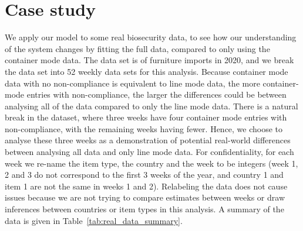 \documentclass[aoas]{imsart}
\begin{document}
%
%
%
%
%
%


\section{Case study}
We apply our model to some real biosecurity data, to see how our understanding of the system changes by fitting the full data, compared to only using the container mode data. The data set is of furniture imports in 2020, and we break the data set into 52 weekly data sets for this analysis. Because container mode data with no non-compliance is equivalent to line mode data, the more container-mode entries with non-compliance, the larger the differences could be between analysing all of the data compared to only the line mode data. There is a natural break in the dataset, where three weeks have four container mode entries with non-compliance, with the remaining weeks having fewer. Hence, we choose to analyse these three weeks as a demonstration of potential real-world differences between analysing all data and only line mode data. For confidentiality, for each week we re-name the item type, the country and the week to be integers (week 1, 2 and 3 do not correspond to the first 3 weeks of the year, and country 1 and item 1 are not the same in weeks 1 and 2). Relabeling the data does not cause issues because we are not trying to compare estimates between weeks or draw inferences between countries or item types in this analysis. A summary of the data is given in Table~\ref{tab:real_data_summary}.
\end{document}
